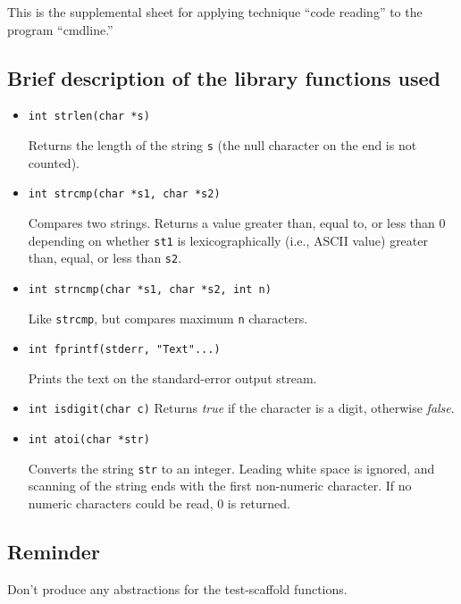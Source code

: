 
This is the supplemental sheet 
for applying technique ``code reading''
to the program ``cmdline.''

\subsection*{Brief description of the library functions used}

\begin{itemize}

\item {\tt int strlen(char *s)}

Returns the length of the string {\tt s} (the null character on the end
is not counted).

\item {\tt int strcmp(char *s1, char *s2)}

Compares two strings.  Returns a value greater than, equal to, or less
than 0 depending on whether {\tt st1} is lexicographically (i.e.,
ASCII value) greater than, equal, or less than {\tt s2}.

\item {\tt int strncmp(char *s1, char *s2, int n)}

Like {\tt strcmp}, but compares maximum {\tt n} characters.

\item {\tt int fprintf(stderr, "Text"...)}

Prints the text on the standard-error output stream.

\item {\tt int isdigit(char c)}
Returns {\em true} if the character is a digit, otherwise {\em false}.

\item {\tt int atoi(char *str)}

Converts the string {\tt str} to an integer.
Leading white space is ignored, and scanning of the string ends
with the first non-numeric character.
If no numeric characters could be read, 0 is returned.

\end{itemize}

\subsection*{Reminder}

Don't produce any abstractions for the test-scaffold functions.
